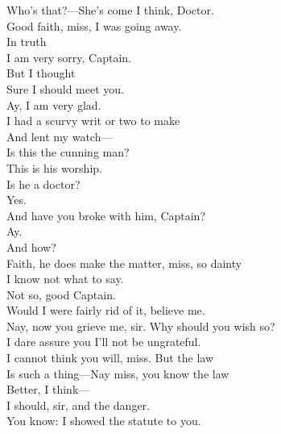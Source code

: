 \documentclass[a4paper,oneside,12pt]{memoir}
\begin{document}
\begin{drama*}
\facespeaks {} Who's that?---She's come I think, Doctor.\\
Good faith, miss, I was going away.\\
\dapperspeaks {} In truth\\
I am very sorry, Captain.\\
\facespeaks {} But I thought\\
Sure I should meet you.\\
\dapperspeaks {} Ay, I am very glad.\\
I had a scurvy writ or two to make\\
And lent my watch---\\
 Is this the cunning man?\\
\facespeaks This is his worship.\\
\dapperspeaks {} Is he a doctor?\\
\facespeaks {} Yes.\\
\dapperspeaks And have you broke with him, Captain?\\
\facespeaks {} Ay.\\
\dapperspeaks {} And how?\\
\facespeaks Faith, he does make the matter, miss, so dainty\\
I know not what to say.\\
\dapperspeaks {} Not so, good Captain.\\
\facespeaks Would I were fairly rid of it, believe me.\\
\dapperspeaks Nay, now you grieve me, sir. Why should you wish so?\\
I dare assure you I'll not be ungrateful.\\
\facespeaks I cannot think you will, miss. But the law\\
Is such a thing---Nay miss, you know the law\\
Better, I think---\\
\dapperspeaks {} I should, sir, and the danger.\\
You know: I showed the statute to you.\\

\end{drama*}
\end{document}

